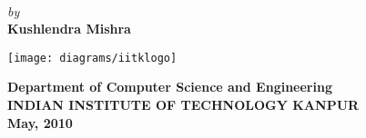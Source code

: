 \titlepage
\begin{center}
\\
\end{center}
\vspace{50mm}
\begin{center}
{\it by}\\
\vspace{5mm}
{\bf{\Large Kushlendra Mishra}}\\
\end{center}
\vspace{45mm}
\begin{center}
\texttt{[image: diagrams/iitklogo]}
\end{center}
\begin{center}
\vspace{3mm}
{\bf {\large {\sc Department of Computer Science and Engineering}}}\\
\vspace{2mm}
{\bf {\large INDIAN INSTITUTE OF TECHNOLOGY KANPUR}}\\
\vspace{3mm}
{\textbf{ May, 2010}}\\
\end{center}


